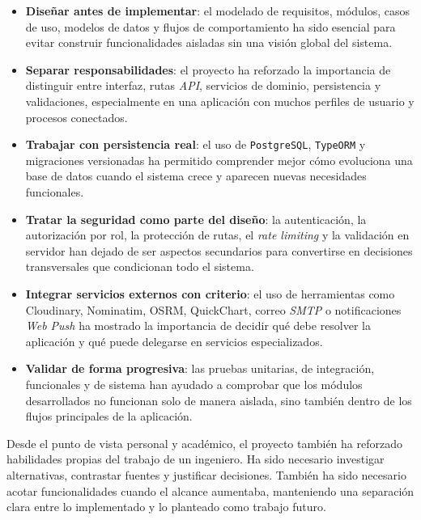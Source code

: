 \begin{itemize}
    \item \textbf{Diseñar antes de implementar}: el modelado de requisitos, módulos, casos de uso, modelos de datos y flujos de comportamiento ha sido esencial para evitar construir funcionalidades aisladas sin una visión global del sistema.

    \item \textbf{Separar responsabilidades}: el proyecto ha reforzado la importancia de distinguir entre interfaz, rutas \textit{API}, servicios de dominio, persistencia y validaciones, especialmente en una aplicación con muchos perfiles de usuario y procesos conectados.

    \item \textbf{Trabajar con persistencia real}: el uso de \texttt{PostgreSQL}, \texttt{TypeORM} y migraciones versionadas ha permitido comprender mejor cómo evoluciona una base de datos cuando el sistema crece y aparecen nuevas necesidades funcionales.

    \item \textbf{Tratar la seguridad como parte del diseño}: la autenticación, la autorización por rol, la protección de rutas, el \textit{rate limiting} y la validación en servidor han dejado de ser aspectos secundarios para convertirse en decisiones transversales que condicionan todo el sistema.

    \item \textbf{Integrar servicios externos con criterio}: el uso de herramientas como Cloudinary, Nominatim, OSRM, QuickChart, correo \textit{SMTP} o notificaciones \textit{Web Push} ha mostrado la importancia de decidir qué debe resolver la aplicación y qué puede delegarse en servicios especializados.

    \item \textbf{Validar de forma progresiva}: las pruebas unitarias, de integración, funcionales y de sistema han ayudado a comprobar que los módulos desarrollados no funcionan solo de manera aislada, sino también dentro de los flujos principales de la aplicación.
\end{itemize}

Desde el punto de vista personal y académico, el proyecto también ha reforzado habilidades propias del trabajo de un ingeniero. Ha sido necesario investigar alternativas, contrastar fuentes y justificar decisiones. También ha sido necesario acotar funcionalidades cuando el alcance aumentaba, manteniendo una separación clara entre lo implementado y lo planteado como trabajo futuro.

